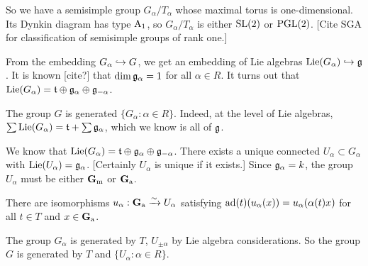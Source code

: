 So we have a semisimple group $G_\alpha/T_\alpha$ whose maximal torus is 
one-dimensional. Its Dynkin diagram has type $\mathrm{A}_1$, so $G_\alpha/T_\alpha$ 
is either $\operatorname{SL}(2)$ or $\operatorname{PGL}(2)$. [Cite SGA for classification of semisimple 
groups of rank one.]

From the embedding $G_\alpha\hookrightarrow G$, we get an embedding of Lie algebras 
$\operatorname{Lie}(G_\alpha)\hookrightarrow \mathfrak{g}$. It is known [cite?] that $\dim\mathfrak{g}_\alpha=1$ for all 
$\alpha\in R$. It turns out that 
$\operatorname{Lie}(G_\alpha)=\mathfrak{t}\oplus \mathfrak{g}_\alpha\oplus \mathfrak{g}_{-\alpha}$. 

The group $G$ is generated $\{G_\alpha:\alpha\in R\}$. Indeed, at 
the level of Lie algebras, $\sum \operatorname{Lie}(G_\alpha)=\mathfrak{t}+\sum \mathfrak{g}_\alpha$, which 
we know is all of $\mathfrak{g}$. 

We know that $\operatorname{Lie}(G_\alpha)=\mathfrak{t}\oplus \mathfrak{g}_\alpha\oplus \mathfrak{g}_{-\alpha}$. There 
exists a unique connected $U_\alpha\subset G_\alpha$ with 
$\operatorname{Lie}(U_\alpha)=\mathfrak{g}_\alpha$. [Certainly $U_\alpha$ is unique if it exists.] 
Since $\mathfrak{g}_\alpha=k$, the group $U_\alpha$ must be either $\mathbf{G}_\mathrm{m}$ or $\mathbf{G}_\mathrm{a}$. 

\begin{theorem}
There are isomorphisms $u_\alpha:\mathbf{G}_\mathrm{a}\xrightarrow\sim U_\alpha$ satisfying 
$\operatorname{ad}(t)(u_\alpha(x)) = u_\alpha(\alpha(t) x)$ for all $t\in T$ and 
$x\in \mathbf{G}_\mathrm{a}$. 
\end{theorem}

The group $G_\alpha$ is generated by $T$, $U_{\pm\alpha}$ by Lie 
algebra considerations. So the group $G$ is generated by $T$ and 
$\{U_\alpha:\alpha\in R\}$. 

